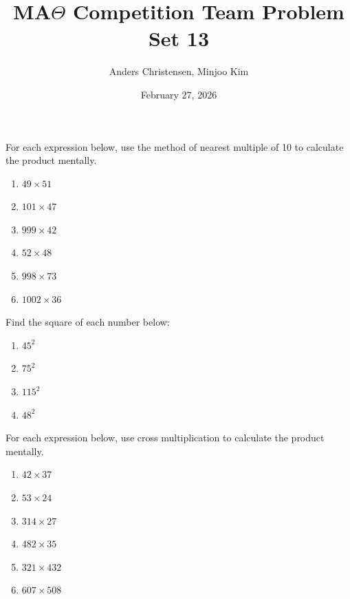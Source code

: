 \documentclass[12pt]{article}
\newenvironment{problem}[2][Problem]{\begin{trivlist}
\item[\hskip \labelsep {\bfseries #1}\hskip \labelsep {\bfseries #2.}]}{\end{trivlist}}
\begin{document}
\title{MA$\Theta$ Competition Team  Problem Set 13}
\author{Anders Christensen, Minjoo Kim}
\date{February 27, 2026}
\maketitle
\begin{problem}{1}
  For each expression below, use the method of nearest multiple of 10 to calculate the product mentally.
\begin{enumerate}
\item $49 \times 51$
\item $101 \times 47$
\item $999 \times 42$
\item $52 \times 48$
\item $998 \times 73$
\item $1002 \times 36$
\end{enumerate}
\end{problem}

\begin{problem}{2}
  Find the square of each number below:
\begin{enumerate}
\item $45^2$
\item $75^2$
\item $115^2$
\item $48^2$
\end{enumerate}
\end{problem}

\begin{problem}{3}
  For each expression below, use cross multiplication to calculate the product mentally.
\begin{enumerate}
\item $42 \times 37$
\item $53 \times 24$
\item $314 \times 27$
\item $482 \times 35$
\item $321 \times 432$
\item $607 \times 508$
\end{enumerate}
\end{problem}
\end{document}
